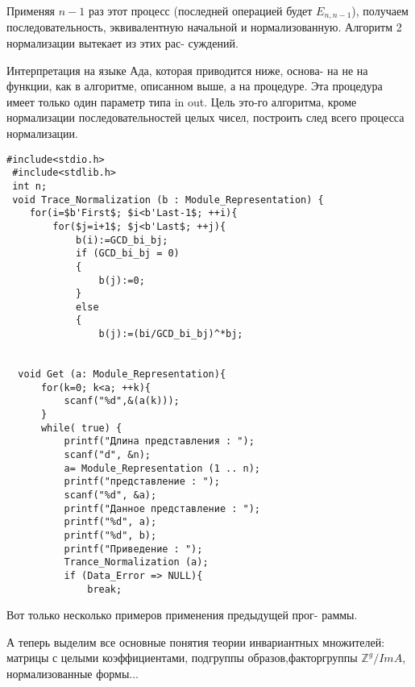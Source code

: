 \begin{myproof}
\noindent Применяя $n-1$ раз этот процесс (последней операцией будет \linebreak $E_{n, n-1}$), получаем последовательность, эквивалентную начальной и \linebreak нормализованную. Алгоритм 2 нормализации вытекает из этих рас- \linebreak суждений.
\end{myproof}
Интерпретация на языке Ада, которая приводится ниже, основа- \linebreak на не на функции, как в алгоритме, описанном выше, а на процедуре. \linebreak Эта процедура имеет только один параметр типа in out. Цель это-\linebreak го алгоритма, кроме нормализации последовательностей целых чисел, \linebreak построить след всего процесса нормализации.
\begin{lstlisting}[mathescape=true]
 #include<stdio.h>
 #include<stdlib.h>
 int n;   
 void Trace_Normalization (b : Module_Representation) {
    for(i=$b'First$; $i<b'Last-1$; ++i){
        for($j=i+1$; $j<b'Last$; ++j){
            b(i):=GCD_bi_bj;
            if (GCD_bi_bj = 0) 
            {
                b(j):=0; 
            } 
            else 
            {    
                b(j):=(bi/GCD_bi_bj)^*bj;

        
  void Get (a: Module_Representation){
      for(k=0; k<a; ++k){
          scanf("%d",&(a(k)));
      }
      while( true) {
          printf("Длина представления : ");
          scanf("d", &n);
          a= Module_Representation (1 .. n);
          printf("представление : ");
          scanf("%d", &a);
          printf("Данное представление : ");
          printf("%d", a);
          printf("%d", b);
          printf("Приведение : ");
          Trance_Normalization (a);
          if (Data_Error => NULL){
              break;          
\end{lstlisting}
\newpage
Вот только несколько примеров применения предыдущей прог- \linebreak раммы. 
\begin{figure}[h]
\end{figure}
\noindent А теперь выделим все основные понятия теории инвариантных множителей: матрицы с целыми коэффициентами, подгруппы образов,\linebreak факторгруппы $\mathbb{Z}^g/ImA$, нормализованные формы...  
